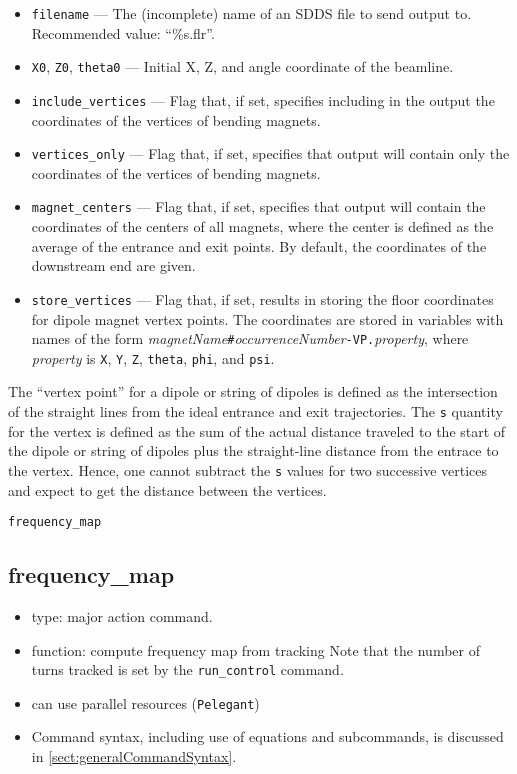 \documentclass[11pt]{article}
\begin{document}
\begin{itemize}
\item \verb|filename| --- The (incomplete) name of an SDDS file to send output to.  
 Recommended value: ``\%s.flr''.
\item \verb|X0|, \verb|Z0|, \verb|theta0| --- Initial X, Z, and angle coordinate of the beamline.
\item \verb|include_vertices| --- Flag that, if set, specifies including  in the output
the coordinates of the vertices of bending magnets. 
\item \verb|vertices_only| --- Flag that, if set, specifies that output will contain only
the coordinates of the vertices of bending magnets. 
\item \verb|magnet_centers| --- Flag that, if set, specifies that output will contain 
the coordinates of the centers of all magnets, where the center is defined as the average of the
entrance and exit points. By default, the coordinates of the downstream
end are given.
\item \verb|store_vertices| --- Flag that, if set, results in storing the floor coordinates for
  dipole magnet vertex points. The coordinates are stored in variables with names of the form
  {\em magnetName}\verb|#|{\em occurrenceNumber}\verb|-VP.|{\em property}, where {\em property}
  is \verb|X|, \verb|Y|, \verb|Z|, \verb|theta|, \verb|phi|, and \verb|psi|.
\end{itemize}

The ``vertex  point'' for a dipole or string of dipoles is defined as the intersection of the
straight lines from the ideal entrance and exit trajectories. 
The \verb|s| quantity for the vertex is defined as the sum of the actual distance traveled to the
start of the dipole or string of dipoles plus the straight-line distance from the entrace to the
vertex. 
Hence, one cannot subtract the \verb|s| values for two successive vertices and expect to get the
distance between the vertices.

\newpage
\begin{center}{\Large\verb|frequency_map|}\end{center}
\subsection{frequency\_map \label{subsec:frequencymap}}

\begin{itemize}
\item type: major action command.  
\item function: compute frequency map from tracking
      Note that the number of turns tracked is set by the \verb|run_control| command.
\item can use parallel resources (\verb|Pelegant|)
\item Command syntax, including use of equations and subcommands, is discussed in \ref{sect:generalCommandSyntax}.
\end{itemize}
\end{document}
